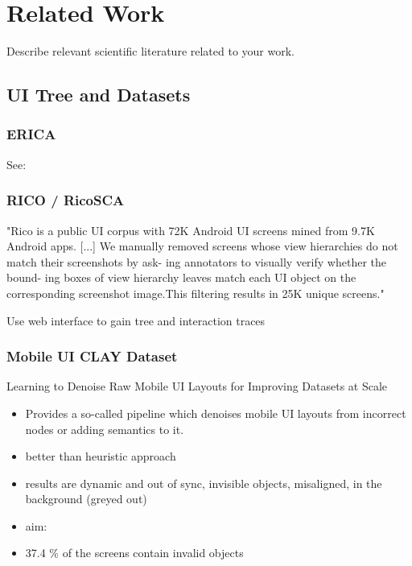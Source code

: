 \chapter{Related Work}

Describe relevant scientific literature related to your work.

\section{UI Tree and Datasets}

\subsection{ERICA}

See: \cite{deka2016erica}

\subsection{RICO / RicoSCA}

"Rico is a public UI corpus with 72K Android UI
screens mined from 9.7K Android apps. [...]
We manually removed screens whose view
hierarchies do not match their screenshots by ask-
ing annotators to visually verify whether the bound-
ing boxes of view hierarchy leaves match each UI
object on the corresponding screenshot image.This filtering results in 25K unique screens."

Use web interface to gain tree and interaction traces

\subsection{Mobile UI CLAY Dataset}

Learning to Denoise Raw Mobile UI Layouts for Improving Datasets at Scale

\begin{itemize}
  \item Provides a so-called  pipeline which denoises mobile UI layouts from incorrect nodes or adding semantics to it.
  \item better than heuristic approach
  \item results are dynamic and out of sync, invisible objects, misaligned, in the background (greyed out)
  \item aim: 
  \item 37.4 \% of the screens contain invalid objects
\end{itemize}

